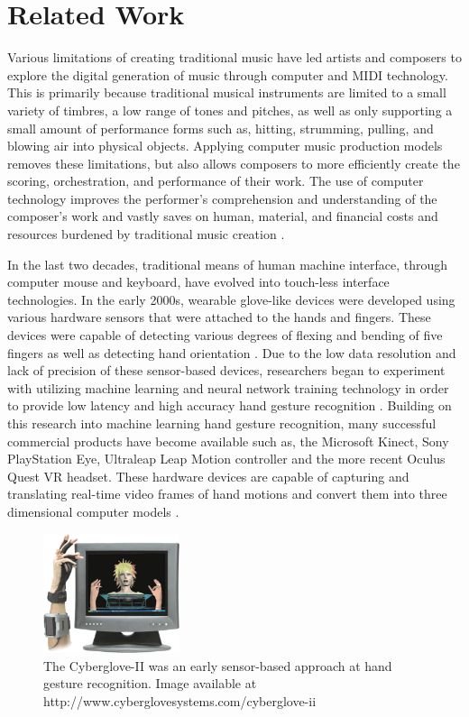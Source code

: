 \documentclass{vgtc}                          %
\begin{document}
\section{Related Work}

Various limitations of creating traditional music have led artists and composers to explore the digital generation of music through computer and MIDI technology. This is primarily because traditional musical instruments are limited to a small variety of timbres, a low range of tones and pitches, as well as only supporting a small amount of performance forms such as, hitting, strumming, pulling, and blowing air into physical objects. Applying computer music production models removes these limitations, but also allows composers to more efficiently create the scoring, orchestration, and performance of their work. The use of computer technology improves the performer's comprehension and understanding of the composer's work and vastly saves on human, material, and financial costs and resources burdened by traditional music creation \cite{Liang:2021:RAD}.

In the last two decades, traditional means of human machine interface, through computer mouse and keyboard, have evolved into touch-less interface technologies. In the early 2000s, wearable glove-like devices were developed using various hardware sensors that were attached to the hands and fingers.  These devices were capable of detecting various degrees of flexing and bending of five fingers as well as detecting hand orientation \cite{Chong:2018:ASL, Kevin:2004:TMI}. Due to the low data resolution and lack of precision of these sensor-based devices, researchers began to experiment with utilizing machine learning and neural network training technology in order to provide low latency and high accuracy hand gesture recognition \cite{Nguyen:2013:SHG}. Building on this research into machine learning hand gesture recognition, many successful commercial products have become available such as, the Microsoft Kinect, Sony PlayStation Eye, Ultraleap Leap Motion controller and the more recent Oculus Quest VR headset. These hardware devices are capable of capturing and translating real-time video frames of hand motions and convert them into three dimensional computer models \cite{Rautaray:2012:VBH, Chen:2020:GCM}.

\begin{figure}[h]
\centering
\includegraphics[width=4cm]{pictures/cyber-glove-2.png}
\centering
\caption{The Cyberglove-II was an early sensor-based approach at hand gesture recognition. Image available at http://www.cyberglovesystems.com/cyberglove-ii}
\end{figure}
\end{document}
